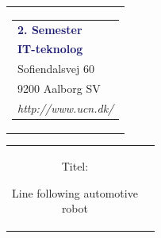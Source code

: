 


% 
\thispagestyle{empty}
\begin{nopagebreak}
{\samepage 

\begin{tabular}{r}
\parbox{\textwidth}{  
\hfill \hspace{2cm} \parbox{8cm}{\begin{tabular}{l} %
{\small \textbf{\textcolor{MidnightBlue}{2. Semester}}}\\
{\small \textbf{\textcolor{MidnightBlue}{IT-teknolog}}}\\ 
{\small \textcolor{NavyBlue}{Sofiendalsvej 60}} \\
{\small \textcolor{NavyBlue}{9200 Aalborg SV}} \\
{\small \textcolor{NavyBlue}{\emph{http://www.ucn.dk/}}}
\end{tabular}}}
\end{tabular}

\begin{tabular}{cc}
\parbox{7cm}{
\begin{description}

\item { Titel:} 

Line following automotive\\ robot

\end{description}

\parbox{8cm}{

}}
\end{tabular}}
\end{nopagebreak}
